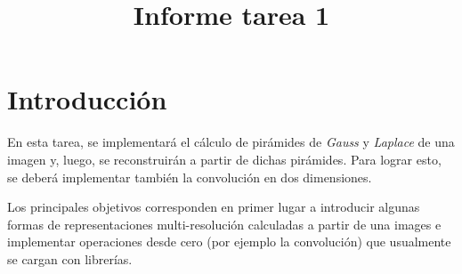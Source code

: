 

\title{Informe tarea 1} %
\newcommand{\ramo}{EL7008-1 Procesamiento Avanzado de Imágenes}
\newcommand{\departamento}{Departamento de Ingeniería Eléctrica}
\newcommand{\semestre}{Semestre Primavera 2020}

\newcommand{\hipertitulo}{}
\newcommand{\titulo}{Tarea 1} 
\newcommand{\subtitulo}{Piramides de \textit{Gauss} y \textit{Laplace}}

\newcommand{\autor}{Diego Irarrázaval I.}





\usepackage{subcaption}



\setcounter{page}{1}
\tableofcontents 
\newpage
\listoffigures
\listoftables
\lstlistoflistings


\newpage
{}
\setcounter{page}{1}

\newpage
\section{Introducción}

\par En esta tarea, se implementará el cálculo de pirámides de \textit{Gauss} y \textit{Laplace} de una imagen y, luego, se reconstruirán a partir de dichas pirámides. Para lograr esto, se deberá implementar también la convolución en dos dimensiones. 
\par Los principales objetivos corresponden en primer lugar a introducir algunas formas de representaciones multi-resolución calculadas a partir de una images e implementar operaciones desde cero (por ejemplo la convolución) que usualmente se cargan con librerías. 

\bigskip


